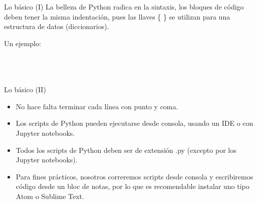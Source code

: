 \documentclass[usenames,dvipsnames]{beamer}
\begin{document}
  \begin{frame}{Lo básico (I)}
    La belleza de Python radica en la sintaxis, los bloques de código deben
    tener la misma indentación, pues las llaves \{ \} se utilizan para una
    estructura de datos (diccionarios).\\

    \vspace*{0.5cm}
    \begin{block}{Un ejemplo:}
        \\
        \\
        \\
        \vspace*{0.5cm}
        \\
        \vspace*{0.5cm}
    \end{block}
  \end{frame}

  \begin{frame}{Lo básico (II)}
    \begin{itemize}
      \item No hace falta terminar cada línea con punto y coma.
      \item Los scripts de Python pueden ejecutarse desde consola, usando un IDE o con
      Jupyter notebooks.
      \item Todos los scripts de Python deben ser de extensión .py (excepto por los
      Jupyter notebooks).
      \item Para fines prácticos, nosotros correremos scripts desde consola y
      escribiremos código desde un bloc de notas, por lo que es recomendable
      instalar uno tipo Atom o Sublime Text.
    \end{itemize}
  \end{frame}
\end{document}
